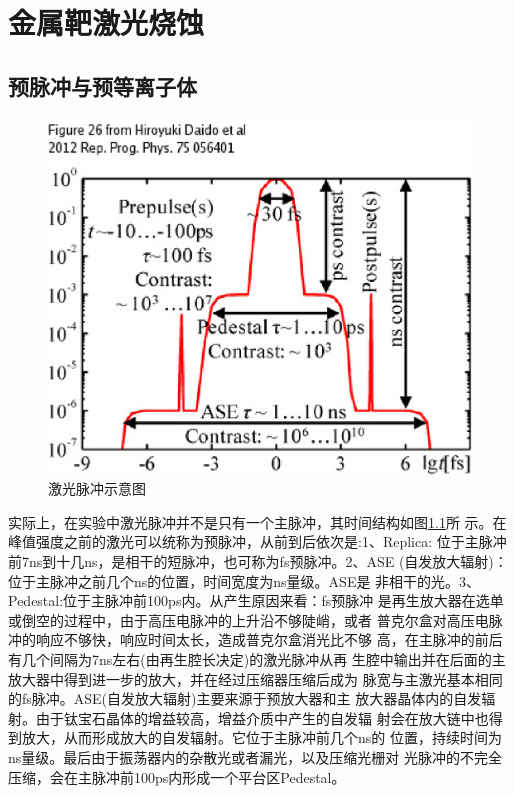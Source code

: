 
\chapter{金属靶激光烧蚀}
\label{chap:guide}

\section{预脉冲与预等离子体}
\begin{figure}[!htbp]
  \centering
  \includegraphics[width=\MyFactor\textwidth]{Img/prepulse2012.eps}
  \caption{激光脉冲示意图}
  \label{fig:prepulse2012}
\end{figure}

实际上，在实验中激光脉冲并不是只有一个主脉冲，其时间结构如图\ref{fig:prepulse2012}所
示。在峰值强度之前的激光可以统称为预脉冲，从前到后依次是:1、Replica:
位于主脉冲前7ns到十几ns，是相干的短脉冲，也可称为fs预脉冲。2、ASE
(自发放大辐射)：位于主脉冲之前几个ns的位置，时间宽度为ns量级。ASE是
非相干的光。3、Pedestal:位于主脉冲前100ps内。从产生原因来看：fs预脉冲
是再生放大器在选单或倒空的过程中，由于高压电脉冲的上升沿不够陡峭，或者
普克尔盒对高压电脉冲的响应不够快，响应时间太长，造成普克尔盒消光比不够
高，在主脉冲的前后有几个间隔为7ns左右(由再生腔长决定)的激光脉冲从再
生腔中输出并在后面的主放大器中得到进一步的放大，并在经过压缩器压缩后成为
脉宽与主激光基本相同的fs脉冲。ASE(自发放大辐射)主要来源于预放大器和主
放大器晶体内的自发辐射。由于钛宝石晶体的增益较高，增益介质中产生的自发辐
射会在放大链中也得到放大，从而形成放大的自发辐射。它位于主脉冲前几个ns的
位置，持续时间为ns量级。最后由于振荡器内的杂散光或者漏光，以及压缩光栅对
光脉冲的不完全压缩，会在主脉冲前100ps内形成一个平台区Pedestal。

